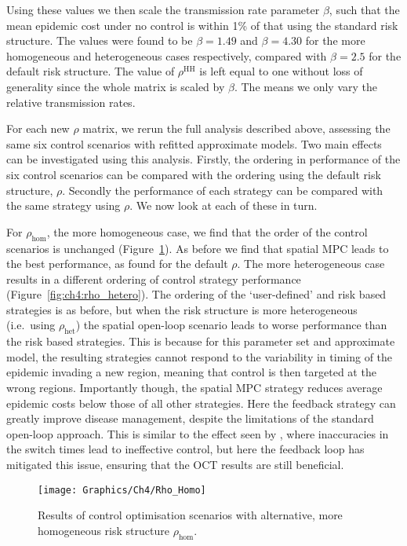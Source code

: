Using these values we then scale the transmission rate parameter $\beta$, such that the mean epidemic cost under no control is within 1\% of that using the standard risk structure. The values were found to be $\beta=1.49$ and $\beta=4.30$ for the more homogeneous and heterogeneous cases respectively, compared with $\beta=2.5$ for the default risk structure. The value of $\rho^{\mathrm{HH}}$ is left equal to one without loss of generality since the whole matrix is scaled by $\beta$. The means we only vary the relative transmission rates.

For each new $\rho$ matrix, we rerun the full analysis described above, assessing the same six control scenarios with refitted approximate models. Two main effects can be investigated using this analysis. Firstly, the ordering in performance of the six control scenarios can be compared with the ordering using the default risk structure, $\rho$. Secondly the performance of each strategy can be compared with the same strategy using $\rho$. We now look at each of these in turn.

For $\rho_{\mathrm{hom}}$, the more homogeneous case, we find that the order of the control scenarios is unchanged (Figure~\ref{fig:ch4:rho_homo}). As before we find that spatial MPC leads to the best performance, as found for the default $\rho$. The more heterogeneous case results in a different ordering of control strategy performance (Figure~\ref{fig:ch4:rho_hetero}). The ordering of the `user-defined' and risk based strategies is as before, but when the risk structure is more heterogeneous (i.e.\ using $\rho_{\mathrm{het}}$) the spatial open-loop scenario leads to worse performance than the risk based strategies. This is because for this parameter set and approximate model, the resulting strategies cannot respond to the variability in timing of the epidemic invading a new region, meaning that control is then targeted at the wrong regions. Importantly though, the spatial MPC strategy reduces average epidemic costs below those of all other strategies. Here the feedback strategy can greatly improve disease management, despite the limitations of the standard open-loop approach. This is similar to the effect seen by \citet{forster_optimizing_2007}, where inaccuracies in the switch times lead to ineffective control, but here the feedback loop has mitigated this issue, ensuring that the OCT results are still beneficial.

\begin{figure}
    \begin{center}
        \texttt{[image: Graphics/Ch4/Rho\_Homo]}
        \caption[Control strategy performance with more homogeneous risk structure]{Results of control optimisation scenarios with alternative, more homogeneous risk structure $\rho_{\mathrm{hom}}$.}
        \label{fig:ch4:rho_homo}
    \end{center}
\end{figure}

